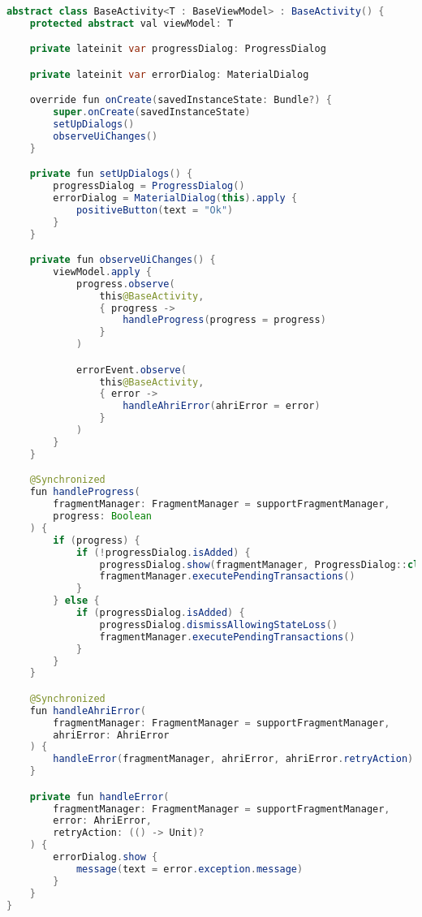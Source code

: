 \begin{lstlisting}[language=Java,label={lst:baseActivity},caption={Компонент BaseActivity}]

abstract class BaseActivity<T : BaseViewModel> : BaseActivity() {
    protected abstract val viewModel: T

    private lateinit var progressDialog: ProgressDialog

    private lateinit var errorDialog: MaterialDialog

    override fun onCreate(savedInstanceState: Bundle?) {
        super.onCreate(savedInstanceState)
        setUpDialogs()
        observeUiChanges()
    }

    private fun setUpDialogs() {
        progressDialog = ProgressDialog()
        errorDialog = MaterialDialog(this).apply {
            positiveButton(text = "Ok")
        }
    }

    private fun observeUiChanges() {
        viewModel.apply {
            progress.observe(
                this@BaseActivity,
                { progress ->
                    handleProgress(progress = progress)
                }
            )

            errorEvent.observe(
                this@BaseActivity,
                { error ->
                    handleAhriError(ahriError = error)
                }
            )
        }
    }

    @Synchronized
    fun handleProgress(
        fragmentManager: FragmentManager = supportFragmentManager,
        progress: Boolean
    ) {
        if (progress) {
            if (!progressDialog.isAdded) {
                progressDialog.show(fragmentManager, ProgressDialog::class.java.canonicalName)
                fragmentManager.executePendingTransactions()
            }
        } else {
            if (progressDialog.isAdded) {
                progressDialog.dismissAllowingStateLoss()
                fragmentManager.executePendingTransactions()
            }
        }
    }

    @Synchronized
    fun handleAhriError(
        fragmentManager: FragmentManager = supportFragmentManager,
        ahriError: AhriError
    ) {
        handleError(fragmentManager, ahriError, ahriError.retryAction)
    }

    private fun handleError(
        fragmentManager: FragmentManager = supportFragmentManager,
        error: AhriError,
        retryAction: (() -> Unit)?
    ) {
        errorDialog.show {
            message(text = error.exception.message)
        }
    }
}
\end{lstlisting}


